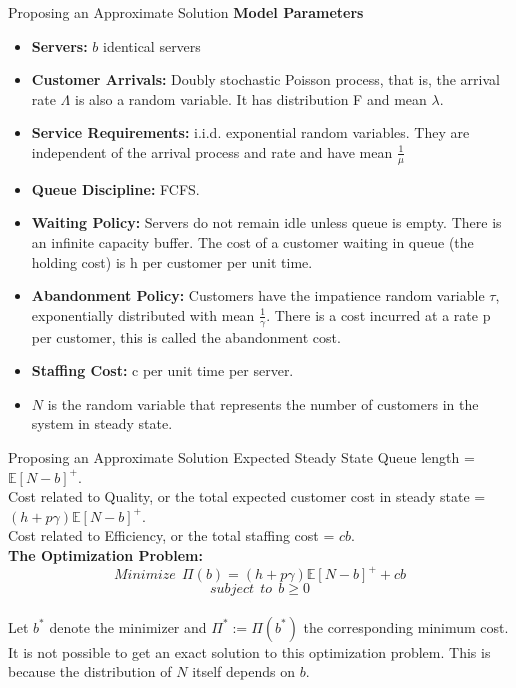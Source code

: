 \documentclass[9pt]{beamer}
\begin{document}
\begin{frame}{Proposing an Approximate Solution}
\textbf{Model Parameters}\begin{itemize}
\itemsep0em
  \item \textbf{Servers:} $b$ identical servers
  \item \textbf{Customer Arrivals:} Doubly stochastic Poisson process, that is, the arrival rate $\Lambda$ is also a random variable. It has distribution F and mean $\lambda$. 
  \item \textbf{Service Requirements:} i.i.d. exponential random variables. They are independent of the arrival process and rate and have mean $\frac{1}{\mu}$
  \item \textbf{Queue Discipline:} FCFS.
  \item \textbf{Waiting Policy:} Servers do not remain idle unless queue is empty. There is an infinite capacity buffer. The cost of a customer waiting in queue (the holding cost) is h per customer per unit time.  
  \item \textbf{Abandonment Policy:} Customers have the impatience random variable $\tau$, exponentially distributed with mean $\frac{1}{\gamma}$. There is a cost incurred at a rate p per customer, this is called the abandonment cost. 
  \item \textbf{Staffing Cost:} c per unit time per server.
  \item $N$ is the random variable that represents the number of customers in the system in steady state. 
\end{itemize}
\end{frame} 

\begin{frame}{Proposing an Approximate Solution}
Expected Steady State Queue length = $\mathbb{E}[N - b]^+$. \\
Cost related to Quality, or the total expected customer cost in steady state = $(h + p\gamma)\mathbb{E}[N - b]^+$. \\
Cost related to Efficiency, or the total staffing cost = $cb$.\\ \bigskip
\textbf{The Optimization Problem:}\\ 
\[Minimize \ \ \Pi(b)=(h + p\gamma)\mathbb{E}[N - b]^+ + cb\]     
\[subject \ \ to \ \ b \geq 0\]    
\\
Let $b^*$ denote the minimizer and $\Pi^* := \Pi(b^*)$ the corresponding minimum cost. \\ \bigskip
It is not possible to get an exact solution to this optimization problem. This is because the distribution of $N$ itself depends on $b$. 
\end{frame} 
\end{document}
